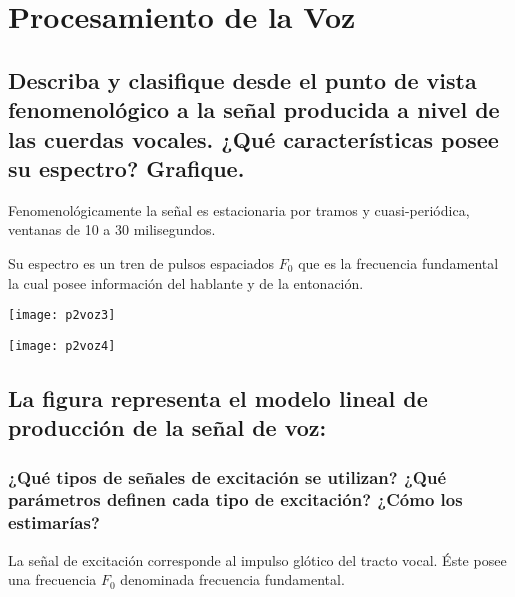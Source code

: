 \documentclass[a4paper,10pt,spanish,oneside]{article}
\begin{document}
\section{Procesamiento de la Voz}

\subsection{Describa y clasifique desde el punto de vista fenomenológico a la señal producida a nivel de las cuerdas vocales. ¿Qué características posee su espectro? Grafique.}

Fenomenológicamente la señal es estacionaria por tramos y cuasi-periódica, ventanas de 10 a 30 milisegundos.

Su espectro es un tren de pulsos espaciados $F_{0}$ que es la frecuencia fundamental la cual posee información del hablante y de la entonación.\\

\begin{minipage}{0.5\linewidth}

\begin{center}
\texttt{[image: p2voz3]}
\end{center}

\end{minipage} \hfill \begin{minipage}{0.5\linewidth}

\begin{center}
\texttt{[image: p2voz4]}
\end{center}

\end{minipage}

\subsection{La figura representa el modelo lineal de producción de la señal de voz:}

\subsubsection{¿Qué tipos de señales de excitación se utilizan? ¿Qué parámetros definen 			cada tipo de excitación? ¿Cómo los estimarías?}
	
La señal de excitación corresponde al impulso glótico del tracto vocal. Éste posee una frecuencia $F_{0}$ denominada frecuencia fundamental.\\
\end{document}
